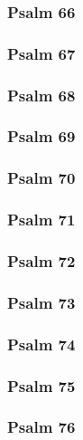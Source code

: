 \documentclass[10pt]{extarticle}
\begin{document}
\begin{multicols}{2}
\subsubsection{Psalm 66}

\newpage

\subsubsection{Psalm 67}

\newpage

\subsubsection{Psalm 68}

\newpage

\subsubsection{Psalm 69}

\newpage

\subsubsection{Psalm 70}

\newpage

\subsubsection{Psalm 71}

\newpage

\subsubsection{Psalm 72}

\newpage

\subsubsection{Psalm 73}

\newpage

\subsubsection{Psalm 74}

\newpage

\subsubsection{Psalm 75}

\newpage

\subsubsection{Psalm 76}

\newpage


\end{multicols}
\end{document}
